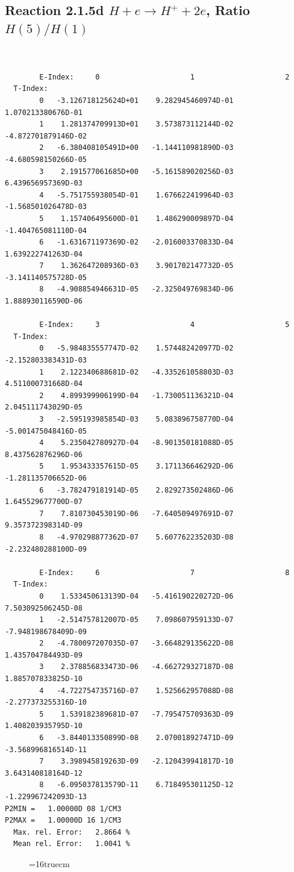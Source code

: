 \documentclass[12pt,dvipdfmx]{article}
\begin{document}
\newpage
\subsection{
Reaction 2.1.5d  $H + e \rightarrow H^+ + 2e$, Ratio $H(5)/H(1)$
}


\begin{small}\begin{verbatim}


        E-Index:     0                     1                     2
  T-Index:
        0   -3.126718125624D+01    9.282945460974D-01    1.070213380676D-01
        1    1.281374709913D+01    3.573873112144D-02   -4.872701879146D-02
        2   -6.380408105491D+00   -1.144110981890D-03   -4.680598150266D-05
        3    2.191577061685D+00   -5.161589020256D-03    6.439656957369D-03
        4   -5.751755938054D-01    1.676622419964D-03   -1.568501026478D-03
        5    1.157406495600D-01    1.486290009897D-04   -1.404765081110D-04
        6   -1.631671197369D-02   -2.016003370833D-04    1.639222741263D-04
        7    1.362647208936D-03    3.901702147732D-05   -3.141140575728D-05
        8   -4.908854946631D-05   -2.325049769834D-06    1.888930116590D-06

        E-Index:     3                     4                     5
  T-Index:
        0   -5.984835557747D-02    1.574482420977D-02   -2.152803383431D-03
        1    2.122340688681D-02   -4.335261058803D-03    4.511000731668D-04
        2    4.899399906199D-04   -1.730051136321D-04    2.045111743029D-05
        3   -2.595193985854D-03    5.083896758770D-04   -5.001475048416D-05
        4    5.235042780927D-04   -8.901350181088D-05    8.437562876296D-06
        5    1.953433357615D-05    3.171136646292D-06   -1.281135706652D-06
        6   -3.782479181914D-05    2.829273502486D-06    1.645529677700D-07
        7    7.810730453019D-06   -7.640509497691D-07    9.357372398314D-09
        8   -4.970298877362D-07    5.607762235203D-08   -2.232480288100D-09

        E-Index:     6                     7                     8
  T-Index:
        0    1.533450613139D-04   -5.416190220272D-06    7.503092506245D-08
        1   -2.514757812007D-05    7.098607959133D-07   -7.948198678409D-09
        2   -4.780097207035D-07   -3.664829135622D-08    1.435704784493D-09
        3    2.378856833473D-06   -4.662729327187D-08    1.885707833825D-10
        4   -4.722754735716D-07    1.525662957088D-08   -2.277373255316D-10
        5    1.539182389681D-07   -7.795475709363D-09    1.408203935795D-10
        6   -3.844013350899D-08    2.070018927471D-09   -3.568996816514D-11
        7    3.398945819263D-09   -2.120439941817D-10    3.643140818164D-12
        8   -6.095037813579D-11    6.718495301125D-12   -1.229967242093D-13
P2MIN =   1.00000D 08 1/CM3
P2MAX =   1.00000D 16 1/CM3
  Max. rel. Error:   2.8664 %
  Mean rel. Error:   1.0041 %

\end{verbatim}\end{small}
\begin{figure} \label{2.1.5d}
\epsfxsize=16truecm
\end{figure}
\end{document}
